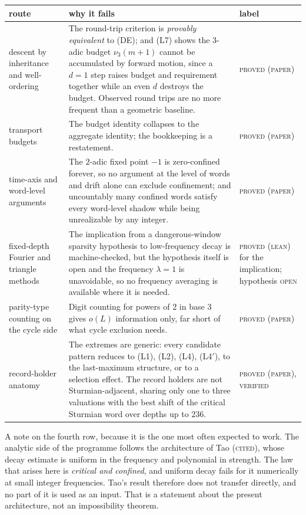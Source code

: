 \documentclass[11pt,reqno]{amsart}
\theoremstyle{plain}
\theoremstyle{definition}
\newcommand{\vth}{\nu_3}
\newcommand{\lab}[1]{\textnormal{\textsc{\small #1}}}
\begin{document}
\begin{center}\small
\begin{tabular}{@{}p{}p{}p{}@{}}
\toprule
route & why it fails & label\\
\midrule
descent by inheritance and well-ordering
& The round-trip criterion is \emph{provably equivalent} to (DE); and (L7) shows
the $3$-adic budget $\vth(m+1)$ cannot be accumulated by forward motion, since a
$d=1$ step raises budget and requirement together while an even $d$ destroys the
budget. Observed round trips are no more frequent than a geometric baseline.
& \lab{proved (paper)}\\[2pt]
transport budgets
& The budget identity collapses to the aggregate identity; the bookkeeping is a
restatement.
& \lab{proved (paper)}\\[2pt]
time-axis and word-level arguments
& The $2$-adic fixed point $-1$ is zero-confined forever, so no argument at the
level of words and drift alone can exclude confinement; and uncountably many
confined words satisfy every word-level shadow while being unrealizable by any
integer.
& \lab{proved (paper)}\\[2pt]
fixed-depth Fourier and triangle methods
& The implication from a dangerous-window sparsity hypothesis to low-frequency
decay is machine-checked, but the hypothesis itself is open and the frequency
$\lambda=1$ is unavoidable, so no frequency averaging is available where it is
needed.
& \lab{proved (lean)} for the implication; hypothesis \lab{open}\\[2pt]
parity-type counting on the cycle side
& Digit counting for powers of $2$ in base $3$ gives $o(L)$ information only, far
short of what cycle exclusion needs.
& \lab{proved (paper)}\\[2pt]
record-holder anatomy
& The extremes are generic: every candidate pattern reduces to (L1), (L2), (L4),
(L4$'$), to the last-maximum structure, or to a selection effect. The record
holders are not Sturmian-adjacent, sharing only one to three valuations with the
best shift of the critical Sturmian word over depths up to $236$.
& \lab{proved (paper)}, \lab{verified}\\
\bottomrule
\end{tabular}
\end{center}

\medskip
\noindent A note on the fourth row, because it is the one most often expected to
work. The analytic side of the programme follows the architecture of Tao
\cite{Tao2022} (\lab{cited}), whose decay estimate is uniform in the frequency and
polynomial in strength. The law that arises here is \emph{critical and confined},
and uniform decay fails for it numerically at small integer frequencies. Tao's
result therefore does not transfer directly, and no part of it is used as an
input. That is a statement about the present architecture, not an impossibility
theorem.
\end{document}
